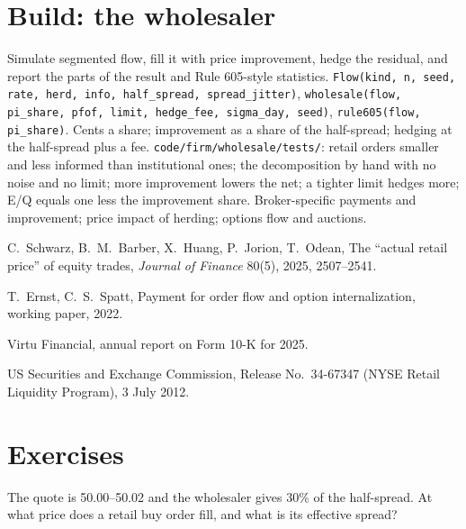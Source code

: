 \section{Build: the wholesaler}\label{bld:hf:retail-wholesaling:wholesale}

\begin{build}
 Simulate segmented flow, fill it with price improvement, hedge the residual, and report the parts of the result and Rule 605-style
statistics.
 \texttt{Flow(kind, n, seed, rate, herd, info, half\_spread, spread\_jitter)}, \texttt{wholesale(flow, pi\_share, pfof, limit,
hedge\_fee, sigma\_day, seed)}, \texttt{rule605(flow, pi\_share)}.
 Cents a share; improvement as a share of the half-spread; hedging at the half-spread plus a fee.
 \texttt{code/firm/wholesale/tests/}: retail orders smaller and less informed than institutional ones; the decomposition by
hand with no noise and no limit; more improvement lowers the net; a tighter limit hedges more; E/Q equals one less the improvement share.
 Broker-specific payments and improvement; price impact of herding; options flow and auctions.
\end{build}

\begin{omsources}
\item C.~Schwarz, B.~M.~Barber, X.~Huang, P.~Jorion, T.~Odean, The ``actual retail price'' of equity trades, \emph{Journal of Finance} 80(5), 2025,
2507--2541.
\item T.~Ernst, C.~S.~Spatt, Payment for order flow and option internalization, working paper, 2022.
\item Virtu Financial, annual report on Form 10-K for 2025.
\item US Securities and Exchange Commission, Release No.\ 34-67347 (NYSE Retail Liquidity Program), 3 July 2012.
\end{omsources}

\section{Exercises}

\begin{exercise}[$\star$]\label{exo:hf:retail-wholesaling:1}
The quote is 50.00--50.02 and the wholesaler gives 30\% of the half-spread. At what price does a retail buy order fill, and what is its effective
spread?
\end{exercise}

